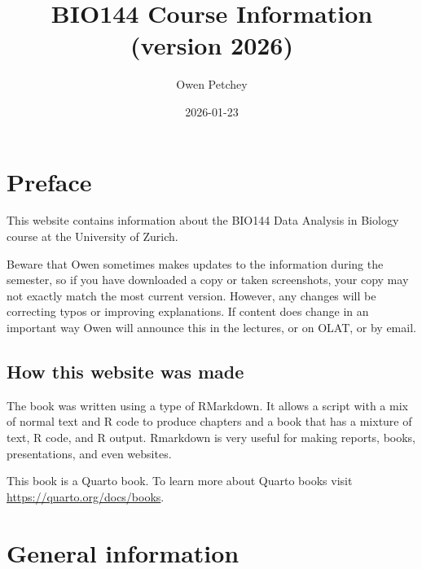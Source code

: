 \documentclass[
  letterpaper,
  8pt,
  a4paper]{book}
\title{BIO144 Course Information (version 2026)}
\author{Owen Petchey}
\date{2026-01-23}
\renewcommand*\contentsname{Table of contents}
\newcommand\contentsname{Table of contents}
\begin{document}
\frontmatter
\maketitle

\renewcommand*\contentsname{Table of contents}
{
\setcounter{tocdepth}{1}
\tableofcontents
}

\mainmatter
{}

\chapter*{Preface}\label{preface}


This website contains information about the BIO144 Data Analysis in
Biology course at the University of Zurich.

Beware that Owen sometimes makes updates to the information during the
semester, so if you have downloaded a copy or taken screenshots, your
copy may not exactly match the most current version. However, any
changes will be correcting typos or improving explanations. If content
does change in an important way Owen will announce this in the lectures,
or on OLAT, or by email.

\section*{How this website was made}\label{how-this-website-was-made}


The book was written using a type of RMarkdown. It allows a script with
a mix of normal text and R code to produce chapters and a book that has
a mixture of text, R code, and R output. Rmarkdown is very useful for
making reports, books, presentations, and even websites.

This book is a Quarto book. To learn more about Quarto books visit
\url{https://quarto.org/docs/books}.


\chapter*{General information}\label{general-information}

\end{document}
